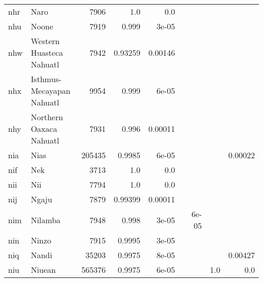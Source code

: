 \documentclass[11pt]{article}
\begin{document}
\begin{table*}[h]
{\begin{tabular}{llrrrrrrr}
nhr         & Naro         & 7906         & 1.0         & 0.0         &          &          &          &          \\

nhu         & Noone         & 7919         & 0.999         & 3e-05         &          &          &          &          \\

nhw         & Western Huasteca Nahuatl         & 7942         & 0.93259         & 0.00146         &          &          &          &          \\

nhx         & Isthmus-Mecayapan Nahuatl         & 9954         & 0.999         & 6e-05         &          &          &          &          \\

nhy         & Northern Oaxaca Nahuatl         & 7931         & 0.996         & 0.00011         &          &          &          &          \\

nia         & Nias         & 205435         & 0.9985         & 6e-05         &          &          &          & 0.00022         \\

nif         & Nek         & 3713         & 1.0         & 0.0         &          &          &          &          \\

nii         & Nii         & 7794         & 1.0         & 0.0         &          &          &          &          \\

nij         & Ngaju         & 7879         & 0.99399         & 0.00011         &          &          &          &          \\

nim         & Nilamba         & 7948         & 0.998         & 3e-05         &          & 6e-05         &          &          \\

nin         & Ninzo         & 7915         & 0.9995         & 3e-05         &          &          &          &          \\

niq         & Nandi         & 35203         & 0.9975         & 8e-05         &          &          &          & 0.00427         \\

niu         & Niuean         & 565376         & 0.9975         & 6e-05         &          &          & 1.0         & 0.0         \\


\end{tabular}}
\end{table*}
\end{document}
